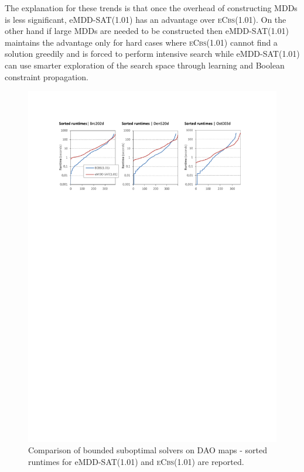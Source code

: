 \documentclass[jair,oneside,11pt]{article}
\begin{document}
The explanation for these trends is that once the overhead of constructing MDDs is less significant, eMDD-SAT(1.01) has an advantage over \textsc{eCbs}(1.01). On the other hand if large MDDs are needed to be constructed then eMDD-SAT(1.01) maintains the advantage only for hard cases where \textsc{eCbs}(1.01) cannot find a solution greedily and is forced to perform intensive search while eMDD-SAT(1.01) can use smarter exploration of the search space through learning and Boolean constraint propagation.


\begin{figure}[h]
\centering
\includegraphics[trim={2.5cm 21.0cm 2.5cm 2.5cm},clip,width=\textwidth]{expr-sub_maps-E-sorted.pdf}
\vspace{-0.8cm}
\caption{Comparison of bounded suboptimal solvers on DAO maps - sorted runtimes for eMDD-SAT(1.01) and \textsc{eCbs}(1.01) are reported.}
\label{expr-sub_maps-E-sorted}
\end{figure}
\end{document}
